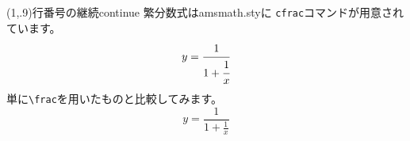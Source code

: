 \begin{showcProg}(1,.9){行番号の継続}{continue}
繁分数式は\textsf{amsmath.sty}に
\verb+cfrac+コマンドが用意されています。
\[
  y = \cfrac{1}{1+\cfrac1x}
\]
単に\verb+\frac+を用いたものと比較してみます。
\[
  y = \frac{1}{1+\frac1x}
\]
\end{showcProg}
